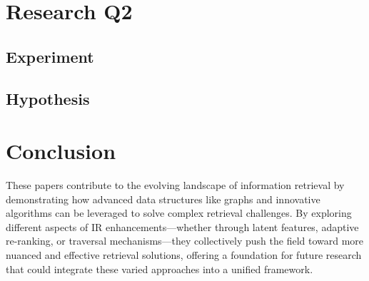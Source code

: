 \documentclass[sigconf,authorversion,nonacm]{acmart}
\begin{document}
\section{Research Q2}

\subsection{Experiment}

\subsection{Hypothesis}
\section{Conclusion}

These papers contribute to the evolving landscape of information retrieval by demonstrating how
advanced data structures like graphs and innovative algorithms can be leveraged to solve complex
retrieval challenges. By exploring different aspects of IR enhancements—whether through latent
features, adaptive re-ranking, or traversal mechanisms—they collectively push the field toward more
nuanced and effective retrieval solutions, offering a foundation for future research that could
integrate these varied approaches into a unified framework.

\section*{}


\end{document}
